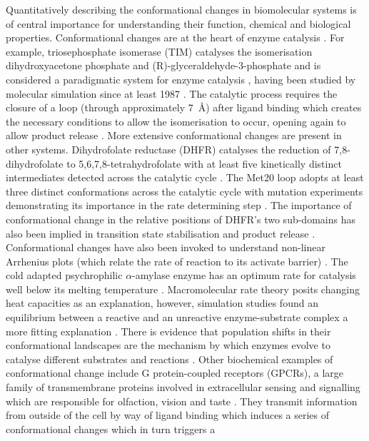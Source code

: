 Quantitatively  describing the conformational changes in biomolecular systems is of central importance for understanding their function, chemical and biological properties. Conformational changes are at the heart of enzyme catalysis \cite{hammes-schifferRelatingProteinMotion2006, karplusMolecularDynamicsProtein2005, hammesMultipleConformationalChanges2002, roca2008relationship}. For example, triosephosphate isomerase (TIM) catalyses the isomerisation dihydroxyacetone phosphate and (R)-glyceraldehyde-3-phosphate \cite{LoopMotionTriosephosphate} and is considered a paradigmatic system for enzyme catalysis \cite{richardParadigmEnzymeCatalyzedProton2012a}, having been studied by molecular simulation since at least 1987 \cite{brownMolecularDynamicsSimulations1987, josephAnatomyConformationalChange1990}.  The catalytic process requires the closure of a loop (through approximately \SI{7}{\angstrom}) after ligand binding which creates the necessary conditions to allow the isomerisation to occur,  opening again to allow product release \cite{LoopMotionTriosephosphate}. More extensive conformational changes are present in other systems.  Dihydrofolate reductase (DHFR) catalyses the reduction of 7,8-dihydrofolate to 5,6,7,8-tetrahydrofolate  \cite{schnellStructureDynamicsCatalytic2004a} with at least five kinetically distinct intermediates detected across the catalytic cycle  \cite{fierkeConstructionEvaluationKinetic1987}. The Met20 loop adopts at least three distinct conformations across the catalytic cycle \cite{sawayaLoopSubdomainMovements1997} with mutation experiments demonstrating its importance in the rate determining step \cite{liFunctionalRoleMobile1992}. The importance of  conformational change in the relative positions of DHFR's two sub-domains has also been implied in transition state stabilisation and product release \cite{sawayaLoopSubdomainMovements1997}.  Conformational changes have also been  invoked to  understand non-linear Arrhenius plots (which relate the rate of reaction to its activate barrier)  \cite{truhlarConvexArrheniusPlots2001,danielNewUnderstandingHow2010}. The cold adapted psychrophilic $\alpha$-amylase enzyme has an optimum rate for catalysis well below its melting temperature \cite{aqvistHiddenConformationalStates2020}. Macromolecular rate theory \cite{arcusTemperatureDynamicsEnzymeCatalyzed2020} posits changing heat capacities as an explanation, however, simulation studies found an equilibrium between a reactive and an unreactive enzyme-substrate complex a more fitting explanation \cite{aqvistHiddenConformationalStates2020}.  There is evidence that population shifts in their conformational landscapes are the mechanism by which  enzymes evolve to catalyse different substrates and reactions \cite{maria-solanoRoleConformationalDynamics2018, campbellRoleProteinDynamics2016,romero-riveraRoleConformationalDynamics2017}. Other biochemical examples of conformational change include G protein-coupled receptors (GPCRs), a large family of transmembrane proteins involved in extracellular sensing and signalling which are responsible for olfaction, vision and taste \cite{rosenbaumStructureFunctionGproteincoupled2009}.  They transmit information from outside of the cell by way of ligand binding which induces a series of conformational changes which in turn triggers a 